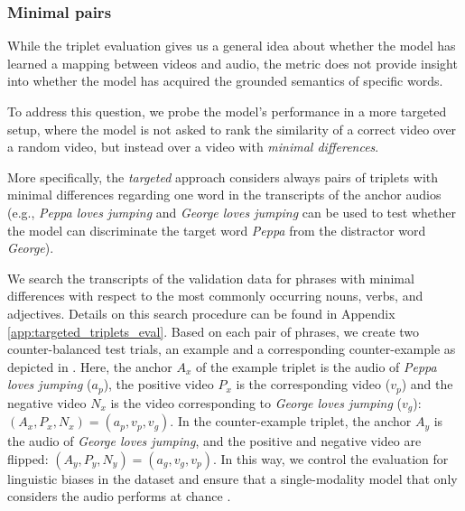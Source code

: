 \subsubsection{Minimal pairs}
\label{sec:targeted}
While the triplet evaluation gives us a general idea about whether the model 
has learned a mapping between videos and audio, the metric does not provide 
insight into whether the model has acquired the grounded semantics of specific 
words.

To address this question, we probe the model's performance in a more targeted 
setup, where the model is not asked to rank the similarity of a correct video 
over a random video, but instead over a video with \textit{minimal differences}.

More specifically, the \emph{targeted} approach considers always pairs of 
triplets with minimal differences regarding one word in the transcripts of
the anchor audios (e.g., \textit{Peppa loves jumping} and
\textit{George loves jumping} can be used to test whether the model
can discriminate the target word \textit{Peppa} from the distractor
word \textit{George}).

We search the transcripts of the validation data for phrases with
minimal differences with respect to the most commonly occurring nouns,
verbs, and adjectives. Details on this search procedure can be found
in Appendix \ref{app:targeted_triplets_eval}.
Based on each pair of
phrases, we create two counter-balanced test trials, an example and a
corresponding counter-example as depicted in
. Here, the anchor $A_x$ of the example
triplet is the audio of \textit{Peppa loves jumping} ($a_p$), the
positive video $P_x$ is the corresponding video ($v_p$) and the
negative video $N_x$ is the video corresponding to \textit{George
  loves jumping} ($v_g$): $(A_x, P_x, N_x) = (a_p, v_p, v_g)$.  In the
counter-example triplet, the anchor $A_y$ is the audio of
\textit{George loves jumping}, and the positive and negative video are
flipped: $(A_y, P_y, N_y) = (a_g, v_g, v_p)$. In this way, we control
the evaluation for linguistic biases in the dataset and ensure that a
single-modality model that only considers the audio performs at chance
\citep[see also][]{nikolaus-fourtassi-2021-evaluating}.

